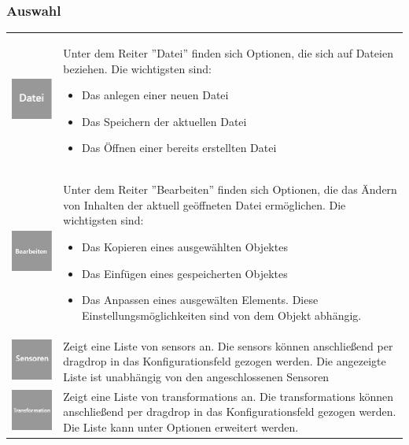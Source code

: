\documentclass[parskip=full]{scrartcl}
\begin{document}
\subsubsection{Auswahl}

\begin{tabular}[t]{p{1cm} p{10cm}}
	\vspace{0cm}\includegraphics[width = 1 cm]{Grafik/Datei.png} & Unter dem Reiter ''Datei'' finden sich Optionen, die sich auf Dateien beziehen. Die wichtigsten sind: 
	\begin{itemize} 
		\item Das anlegen einer neuen Datei
		\item Das Speichern der aktuellen Datei
		\item Das Öffnen einer bereits erstellten Datei
	\end{itemize}\\
	\vspace{0cm}\includegraphics[width = 1 cm]{Grafik/Bearbeiten.png} & Unter dem Reiter ''Bearbeiten'' finden sich Optionen, die das Ändern von Inhalten der aktuell geöffneten Datei ermöglichen. Die wichtigsten sind:
	\begin{itemize} 
		\item Das Kopieren eines ausgewählten Objektes
		\item Das Einfügen eines gespeicherten Objektes
		\item Das Anpassen eines ausgewälten Elements. Diese Einstellungsmöglichkeiten sind von dem Objekt abhängig.
	\end{itemize}\\
	\vspace{0cm}\includegraphics[width = 1 cm]{Grafik/Sensor.png} & Zeigt eine Liste von \glspl{sensor} an. Die \glspl{sensor} können anschließend per \gls{dragdrop} in das Konfigurationsfeld gezogen werden. Die angezeigte Liste ist unabhängig von den angeschlossenen Sensoren\newline\\
	\vspace{0cm}\includegraphics[width = 1 cm]{Grafik/Verbindung.png} & Zeigt eine Liste von \glspl{transformation} an. Die \glspl{transformation} können anschließend per \gls{dragdrop} in das Konfigurationsfeld gezogen werden. Die Liste kann unter Optionen erweitert werden.\newline\\

\end{tabular}
\end{document}
